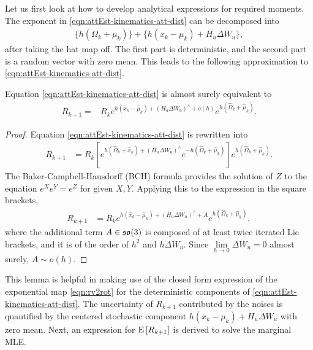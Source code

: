 Let us first look at how to develop analytical expressions for required moments.
The exponent in \eqref{eqn:attEst-kinematics-att-dist} can be decomposed into
\begin{align*}
	\{h(\Omega_k + \mu_k)\} + \{h(x_k-\mu_k) + H_u \Delta W_u\},
\end{align*}
after taking the hat map off. 
The first part is deterministic, and the second part is a random vector with zero mean.  
This leads to the following approximation to \eqref{eqn:attEst-kinematics-att-dist}.

\begin{lemma}
	Equation \eqref{eqn:attEst-kinematics-att-dist} is almost surely equivalent to
	\begin{align} \label{eqn:attEst-kinematics-att-factorization}
		R_{k+1} = & R_ke^{h(\hat{x}_k-\hat{\mu}_k) + (H_u\Delta W_u)^\wedge + o(h)} e^{h(\hat{\Omega}_k+\hat{\mu}_k)}.
	\end{align}
\end{lemma}
\begin{proof}
	Equation \eqref{eqn:attEst-kinematics-att-dist} is rewritten into 
	\begin{align*} 
		R_{k+1} &= R_k \left[ e^{h(\hat{\Omega}_k+\hat{x}_k) + (H_u\Delta W_u)^\wedge} 
		e^{-h(\hat{\Omega}_k+\hat{\mu}_k)} \right] e^{h(\hat{\Omega}_k+\hat{\mu}_k)}.
	\end{align*}
	The Baker-Campbell-Hausdorff (BCH) formula provides the solution of $Z$ to the equation $e^X e^Y = e^Z$ for given $X,Y$. 
	Applying this to the expression in the square brackets,  
	\begin{align} \label{eqn:attEst-kinematics-att-factorization-proof}
		R_{k+1} &= R_k e^{h(\hat{x}_k-\hat{\mu}_k) + (H_u\Delta W_u)^\wedge + A} e^{h(\hat{\Omega}_k+\hat{\mu}_k)},
	\end{align}
	where the additional term $A\in\mathfrak{so}(3)$ is composed of at least twice iterated Lie brackets, and it is of the order of $h^2$ and $h\Delta W_u$.
	Since $\lim\limits_{h \to 0}\Delta W_u=0$ almost surely, $A \sim o(h)$.
\end{proof}

This lemma is helpful in making use of the closed form expression of the exponential map \eqref{eqn:rv2rot} for the deterministic components of \eqref{eqn:attEst-kinematics-att-dist}.
The uncertainty of $R_{k+1}$ contributed by the noises is quantified by the centered stochastic component $h(x_k-\mu_k) + H_u\Delta W_u$ with zero mean.
Next, an expression for $\mathrm{E}\left[ R_{k+1} \right]$ is derived to solve the marginal MLE.

